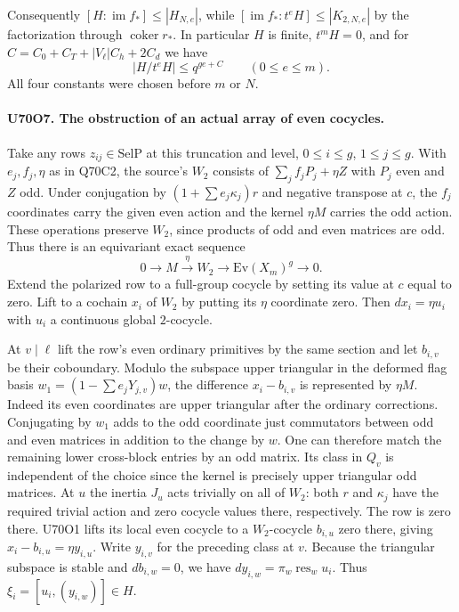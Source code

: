 Consequently $[H:\operatorname{im} f_*]\le|H_{N,e}|$, while
$[\operatorname{im} f_*:t^e H]\le|K_{2,N,e}|$ by the
factorization through $\operatorname{coker} r_*$. In particular
$H$ is finite, $t^mH=0$, and for
$C=C_0+C_T+|V_\ell|C_h+2C_d$ we have
\[
                       |H/t^eH|\le q^{ge+C}
                       \qquad(0\le e\le m).
\]
All four constants were chosen before $m$ or $N$.

\paragraph{U70O7. The obstruction of an actual array of even cocycles.}
Take any rows $z_{ij}\in\mathrm{SelP}$ at this truncation
and level, $0\le i\le g$, $1\le j\le g$.
With $e_j,f_j,\eta$ as in Q70C2, the source's $W_2$ consists of
$\sum_j f_jP_j+\eta Z$ with $P_j$ even and $Z$ odd.
Under conjugation by $(1+\sum e_j\kappa_j)r$ and negative
transpose at $c$, the $f_j$ coordinates carry the given even
action and the kernel $\eta M$ carries the odd action. These
operations preserve $W_2$, since products of odd and even
matrices are odd. Thus there is an equivariant exact sequence
\[
         0\longrightarrow M\xrightarrow{\,\eta\,}
              W_2\longrightarrow \mathrm{Ev}(X_m)^g\longrightarrow0.
\]
Extend the polarized row to a full-group cocycle by setting its
value at $c$ equal to zero. Lift to a cochain $x_i$ of $W_2$ by
putting its $\eta$ coordinate zero. Then $d x_i=\eta u_i$ with
$u_i$ a continuous global $2$-cocycle.

At $v\mid\ell$ lift the row's even ordinary primitives by the
same section and let $b_{i,v}$ be their coboundary. Modulo the
subspace upper triangular in the deformed flag basis
$w_1=(1-\sum e_jY_{j,v})w$, the difference $x_i-b_{i,v}$
is represented by $\eta M$. Indeed its even coordinates are
upper triangular after the ordinary corrections. Conjugating by
$w_1$ adds to the odd coordinate just commutators between odd
and even matrices in addition to the change by $w$. One can
therefore match the remaining lower cross-block entries by an
odd matrix. Its class in $Q_v$ is independent of the choice
since the kernel is precisely upper triangular odd matrices.
At $u$ the inertia $J_u$ acts trivially on all of $W_2$: both
$r$ and $\kappa_j$ have the required trivial action and zero
cocycle values there, respectively. The row is zero there.
U70O1 lifts its local even cocycle to a $W_2$-cocycle $b_{i,u}$
zero there, giving $x_i-b_{i,u}=\eta y_{i,u}$. Write $y_{i,v}$
for the preceding class at $v$. Because the triangular subspace
is stable and $d b_{i,w}=0$, we have
$d y_{i,w}=\pi_w\operatorname{res}_w u_i$. Thus
$\xi_i=[u_i,(y_{i,w})]\in H$.

